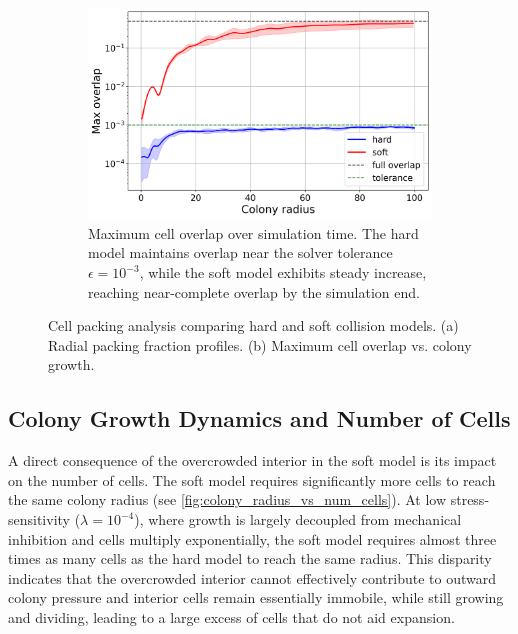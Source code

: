 \documentclass[conference]{IEEEtran}
\begin{document}
\begin{figure}[H]
    \begin{subfigure}[b]{\linewidth}
        \centering
        \includegraphics[width=\linewidth]{figures/comparison_plots/combined_colony_radius_vs_max_overlap_with_lines.png}
        \caption{Maximum cell overlap over simulation time. The hard model maintains overlap near the solver tolerance $\epsilon = 10^{-3}$, while the soft model exhibits steady increase, reaching near-complete overlap by the simulation end.}
        \label{fig:max_overlap_simulation}
    \end{subfigure}

    \caption{Cell packing analysis comparing hard and soft collision models. (a) Radial packing fraction profiles. (b) Maximum cell overlap vs. colony growth.}
    \label{fig:combined_packing_analysis}
\end{figure}

\subsection{Colony Growth Dynamics and Number of Cells}
\label{sec:colony_growth_dynamics}

A direct consequence of the overcrowded interior in the soft model is its impact on the number of cells. The soft model requires significantly more cells to reach the same colony radius (see \autoref{fig:colony_radius_vs_num_cells}). At low stress-sensitivity ($\lambda = 10^{-4}$), where growth is largely decoupled from mechanical inhibition and cells multiply exponentially, the soft model requires almost three times as many cells as the hard model to reach the same radius. This disparity indicates that the overcrowded interior cannot effectively contribute to outward colony pressure and interior cells remain essentially immobile, while still growing and dividing, leading to a large excess of cells that do not aid expansion.
\end{document}
